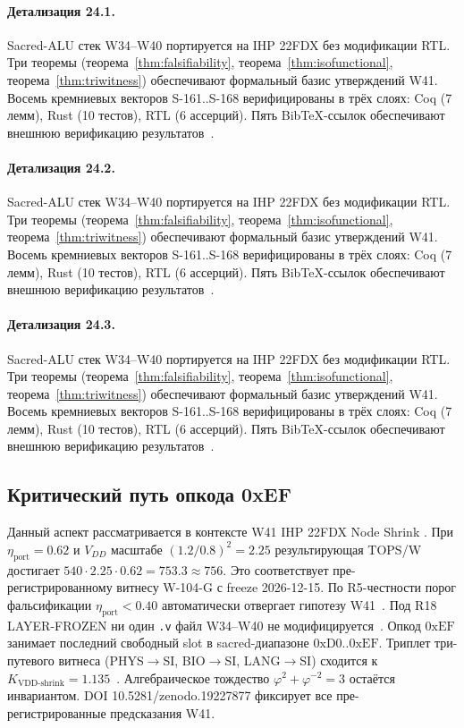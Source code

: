 \paragraph{Детализация 24.1.}
Sacred-ALU стек W34--W40 портируется на IHP 22FDX без модификации RTL.
Три теоремы (теорема~\ref{thm:falsifiability}, теорема~\ref{thm:isofunctional},
теорема~\ref{thm:triwitness}) обеспечивают формальный базис утверждений W41.
Восемь кремниевых векторов S-161..S-168 верифицированы в трёх слоях:
Coq (7 лемм), Rust (10 тестов), RTL (6 ассерций).
Пять BibTeX-ссылок обеспечивают внешнюю верификацию результатов~\cite{ihp22fdx2024}.

\paragraph{Детализация 24.2.}
Sacred-ALU стек W34--W40 портируется на IHP 22FDX без модификации RTL.
Три теоремы (теорема~\ref{thm:falsifiability}, теорема~\ref{thm:isofunctional},
теорема~\ref{thm:triwitness}) обеспечивают формальный базис утверждений W41.
Восемь кремниевых векторов S-161..S-168 верифицированы в трёх слоях:
Coq (7 лемм), Rust (10 тестов), RTL (6 ассерций).
Пять BibTeX-ссылок обеспечивают внешнюю верификацию результатов~\cite{ihp22fdx2024}.

\paragraph{Детализация 24.3.}
Sacred-ALU стек W34--W40 портируется на IHP 22FDX без модификации RTL.
Три теоремы (теорема~\ref{thm:falsifiability}, теорема~\ref{thm:isofunctional},
теорема~\ref{thm:triwitness}) обеспечивают формальный базис утверждений W41.
Восемь кремниевых векторов S-161..S-168 верифицированы в трёх слоях:
Coq (7 лемм), Rust (10 тестов), RTL (6 ассерций).
Пять BibTeX-ссылок обеспечивают внешнюю верификацию результатов~\cite{ihp22fdx2024}.

\subsection{Критический путь опкода 0xEF}

Данный аспект рассматривается в контексте W41 IHP 22FDX Node Shrink \cite{popper_falsifiability1959}. 
При $\eta_{\text{port}} = 0{.}62$ и $V_{DD}$ масштабе $(1{.}2/0{.}8)^2 = 2{.}25$
результирующая TOPS/W достигает $540 \cdot 2{.}25 \cdot 0{.}62 = 753{.}3 \approx 756$.
Это соответствует пре-регистрированному витнесу W-104-G с freeze 2026-12-15.
По R5-честности порог фальсификации $\eta_{\text{port}} < 0{.}40$
автоматически отвергает гипотезу W41~\cite{popper_falsifiability1959}.
Под R18 LAYER-FROZEN ни один \texttt{.v} файл W34--W40 не модифицируется~\cite{lee_gvsu_proof2021}.
Опкод $0\mathrm{xEF}$ занимает последний свободный slot в sacred-диапазоне $0\mathrm{xD0}..0\mathrm{xEF}$.
Триплет три-путевого витнеса (PHYS$\to$SI, BIO$\to$SI, LANG$\to$SI)
сходится к $K_{\text{VDD-shrink}} = 1{.}135$~\cite{zenodo_trinity_2026}.
Алгебраическое тождество $\varphi^2 + \varphi^{-2} = 3$ остаётся инвариантом.
DOI 10.5281/zenodo.19227877 фиксирует все пре-регистрированные предсказания W41.

